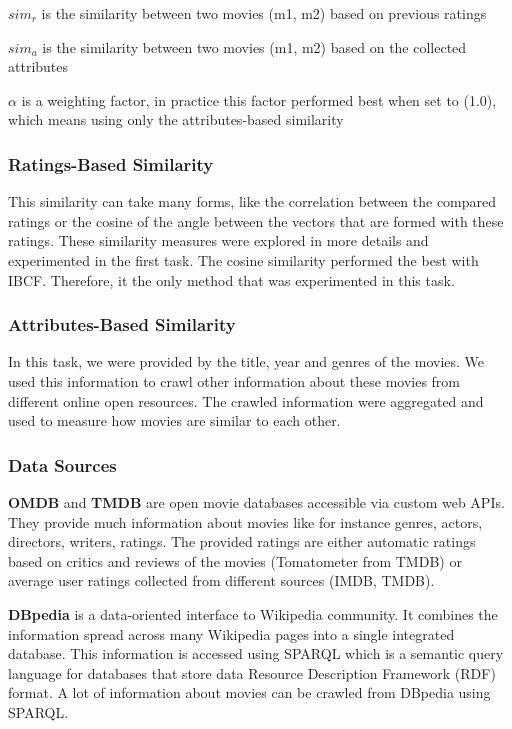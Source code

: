 \documentclass{sigish}
\begin{document}
$ sim_{r} $ is the similarity between two movies (m1, m2) based on previous ratings

$ sim_{a} $ is the similarity between two movies (m1, m2) based on the collected attributes

$ \alpha $  is a weighting factor, in practice this factor performed best when set to (1.0), which means using only the attributes-based similarity

\subsubsection{Ratings-Based Similarity}

This similarity can take many forms, like the correlation between the compared ratings or the cosine of the angle between the vectors that are formed with these ratings. These similarity measures were explored in more details and experimented in the first task. The cosine similarity performed the best with IBCF. Therefore, it the only method that was experimented in this task.

\subsubsection{Attributes-Based Similarity}

In this task, we were provided by the title, year and genres of the movies. We used this information to crawl other information about these movies from different online open resources. The crawled information were aggregated and used to measure how movies are similar to each other.

\subsubsection*{Data Sources}

\textbf{OMDB} and \textbf{TMDB} are open movie databases accessible via custom web APIs. They provide much information about movies like for instance genres, actors, directors, writers, ratings. The provided ratings are either automatic ratings based on critics and reviews of the movies (Tomatometer from TMDB) or average user ratings collected from different sources (IMDB, TMDB).

\textbf{DBpedia} is a data-oriented interface to Wikipedia community. It combines the information spread across many Wikipedia pages into a single integrated database. This information is accessed using SPARQL which is a semantic query language for databases that store data Resource Description Framework (RDF) format. A lot of information about movies can be crawled from DBpedia using SPARQL.
\end{document}
